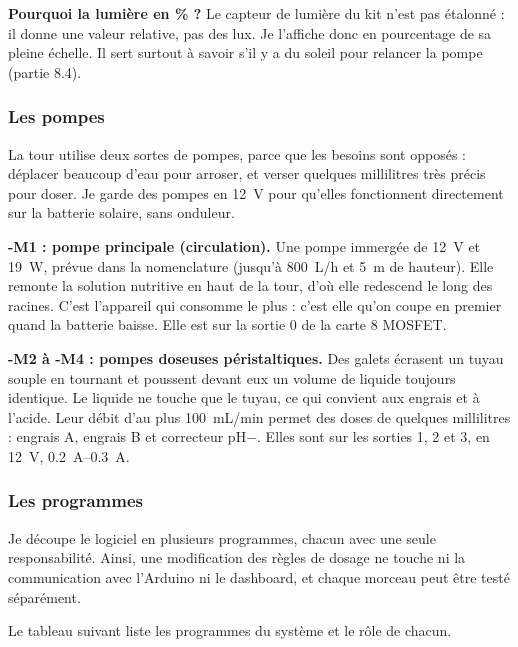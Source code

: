 \textbf{Pourquoi la lumière en \% ?} Le capteur de lumière du kit n'est pas étalonné : il donne une valeur relative, pas des lux. Je l'affiche donc en pourcentage de sa pleine échelle. Il sert surtout à savoir s'il y a du soleil pour relancer la pompe (partie 8.4).

\subsubsection*{Les pompes}

La tour utilise deux sortes de pompes, parce que les besoins sont opposés : déplacer beaucoup d'eau pour arroser, et verser quelques millilitres très précis pour doser. Je garde des pompes en \qty{12}{V} pour qu'elles fonctionnent directement sur la batterie solaire, sans onduleur.

\textbf{-M1 : pompe principale (circulation).} Une pompe immergée de \qty{12}{V} et \qty{19}{W}, prévue dans la nomenclature (jusqu'à \qty{800}{L/h} et \qty{5}{m} de hauteur). Elle remonte la solution nutritive en haut de la tour, d'où elle redescend le long des racines. C'est l'appareil qui consomme le plus : c'est elle qu'on coupe en premier quand la batterie baisse. Elle est sur la sortie 0 de la carte 8 MOSFET.

\textbf{-M2 à -M4 : pompes doseuses péristaltiques.} Des galets écrasent un tuyau souple en tournant et poussent devant eux un volume de liquide toujours identique. Le liquide ne touche que le tuyau, ce qui convient aux engrais et à l'acide. Leur débit d'au plus \qty{100}{mL/min} permet des doses de quelques millilitres : engrais A, engrais B et correcteur pH$-$. Elles sont sur les sorties 1, 2 et 3, en \qty{12}{V}, \qtyrange{0,2}{0,3}{A}.

\subsubsection*{Les programmes}

Je découpe le logiciel en plusieurs programmes, chacun avec une seule responsabilité. Ainsi, une modification des règles de dosage ne touche ni la communication avec l'Arduino ni le dashboard, et chaque morceau peut être testé séparément.

Le tableau suivant liste les programmes du système et le rôle de chacun.

